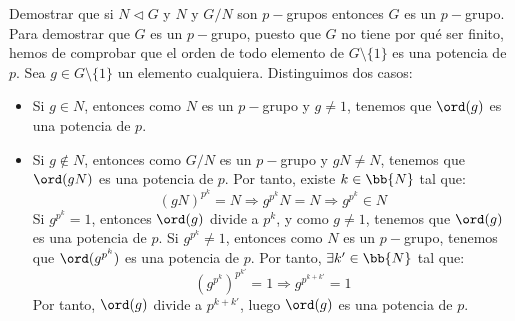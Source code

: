 \begin{ejercicio}\label{ej:6.18}
    Demostrar que si $N\lhd G$ y $N$ y $G/N$ son $p-$grupos entonces $G$ es un $p-$grupo.\\

    Para demostrar que $G$ es un $p-$grupo, puesto que $G$ no tiene por qué ser finito, hemos de comprobar que el orden de todo elemento de $G\setminus \{1\}$ es una potencia de $p$. Sea $g\in G\setminus \{1\}$ un elemento cualquiera. Distinguimos dos casos:
    \begin{itemize}
        \item Si $g\in N$, entonces como $N$ es un $p-$grupo y $g\neq 1$, tenemos que $\ord(g)$ es una potencia de $p$.
        \item Si $g\notin N$, entonces como $G/N$ es un $p-$grupo y $gN\neq N$, tenemos que $\ord(gN)$ es una potencia de $p$. Por tanto, existe $k\in \bb{N}$ tal que:
        \begin{equation*}
            (gN)^{p^k} = N
            \Longrightarrow
            g^{p^k}N = N
            \Longrightarrow
            g^{p^k} \in N
        \end{equation*}
        Si $g^{p^k}=1$, entonces $\ord(g)$ divide a $p^k$, y como $g\neq 1$, tenemos que $\ord(g)$ es una potencia de $p$. Si $g^{p^k}\neq 1$, entonces como $N$ es un $p-$grupo, tenemos que $\ord(g^{p^k})$ es una potencia de $p$. Por tanto, $\exists k'\in \bb{N}$ tal que:
        \begin{equation*}
            \left(g^{p^k}\right)^{p^{k'}} = 1
            \Longrightarrow
            g^{p^{k+k'}} = 1
        \end{equation*}
        Por tanto, $\ord(g)$ divide a $p^{k+k'}$, luego $\ord(g)$ es una potencia de $p$.
    \end{itemize}
\end{ejercicio}

